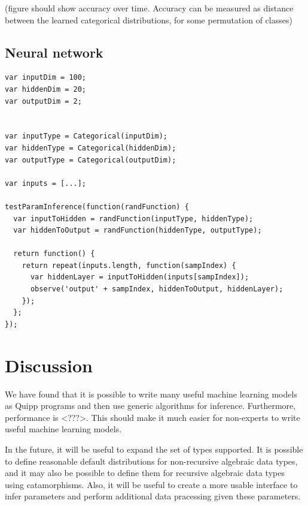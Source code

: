 \documentclass{article}
\begin{document}
(figure should show accuracy over time.  Accuracy can be measured as distance between the learned categorical distributions, for some permutation of classes)

\subsection{Neural network}

{\small
\begin{verbatim}
var inputDim = 100;
var hiddenDim = 20;
var outputDim = 2;


var inputType = Categorical(inputDim);
var hiddenType = Categorical(hiddenDim);
var outputType = Categorical(outputDim);

var inputs = [...];

testParamInference(function(randFunction) {
  var inputToHidden = randFunction(inputType, hiddenType);
  var hiddenToOutput = randFunction(hiddenType, outputType);

  return function() {
    return repeat(inputs.length, function(sampIndex) {
      var hiddenLayer = inputToHidden(inputs[sampIndex]);
      observe('output' + sampIndex, hiddenToOutput, hiddenLayer);
    });
  };
});
\end{verbatim}
}

  \section{Discussion}

  We have found that it is possible to write many useful machine learning models as Quipp programs and then use generic algorithms for inference.  Furthermore, performance is <???>.  This should make it much easier for non-experts to write useful machine learning models.
  
  In the future, it will be useful to expand the set of types supported.  It is possible to define reasonable default distributions for non-recursive algebraic data types, and it may also be possible to define them for recursive algebraic data types using catamorphisms.  Also, it will be useful to create a more usable interface to infer parameters and perform additional data pracessing given these parameters.

{}

\end{document}
